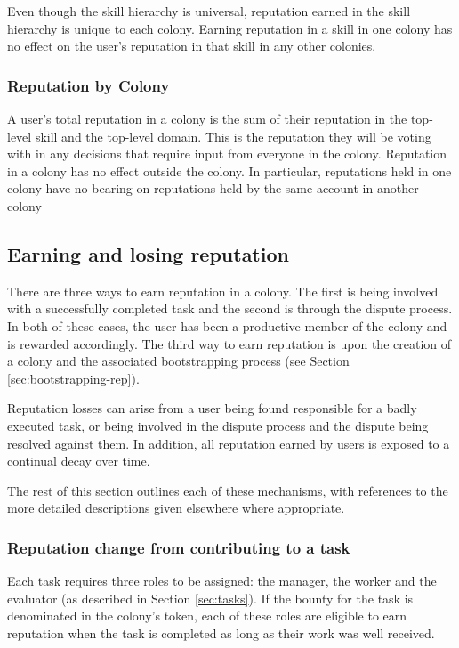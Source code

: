 Even though the skill hierarchy is universal, reputation earned in the skill hierarchy is unique to each colony. Earning reputation in a skill in one colony has no effect on the user's reputation in that skill in any other colonies.

\subsubsection{Reputation by Colony}\label{sec:rep-by-colony}
A user's total reputation in a colony is the sum of their reputation in the top-level skill and the top-level domain. This is the reputation they will be voting with in any decisions that require input from everyone in the colony. Reputation in a colony has no effect outside the colony. In particular, reputations held in one colony have no bearing on reputations held by the same account in another colony

\subsection{Earning and losing reputation}\label{sec:earning-losing-rep}
There are three ways to earn reputation in a colony. The first is being involved with a successfully completed task and the second is through the dispute process. In both of these cases, the user has been a productive member of the colony and is rewarded accordingly. The third way to earn reputation is upon the creation of a colony and the associated bootstrapping process (see Section \ref{sec:bootstrapping-rep}).

Reputation losses can arise from a user being found responsible for a badly executed task, or being involved in the dispute process and the dispute being resolved against them. In addition, all reputation earned by users is exposed to a continual decay over time. 

The rest of this section outlines each of these mechanisms, with references to the more detailed descriptions given elsewhere where appropriate.

\subsubsection{Reputation change from contributing to a task}\label{sec:earning-rep-from-task}
Each task requires three roles to be assigned: the manager, the worker and the evaluator (as described in Section \ref{sec:tasks}). If the bounty for the task is denominated in the colony's token, each of these roles are eligible to earn reputation when the task is completed as long as their work was well received.

